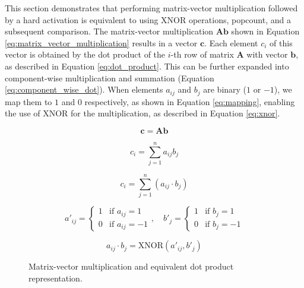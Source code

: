 \documentclass[conference]{IEEEtran}
\begin{document}
This section demonstrates that performing matrix-vector multiplication followed by a hard activation is equivalent to using XNOR operations, popcount, and a subsequent comparison.
The matrix-vector multiplication \(\mathbf{A} \mathbf{b}\) shown in Equation \ref{eq:matrix_vector_multiplication} results in a vector \(\mathbf{c}\). Each element \(c_i\) of this vector is obtained by the dot product of the \(i\)-th row of matrix \(\mathbf{A}\) with vector \(\mathbf{b}\), as described in Equation \ref{eq:dot_product}. This can be further expanded into component-wise multiplication and summation (Equation \ref{eq:component_wise_dot}). When elements \(a_{ij}\) and \(b_j\) are binary (\(1\) or \(-1\)), we map them to \(1\) and \(0\) respectively, as shown in Equation \ref{eq:mapping}, enabling the use of XNOR for the multiplication, as described in Equation \ref{eq:xnor}.

\begin{figure}[ht]
    \centering
    \begin{equation}
    \mathbf{c} = \mathbf{A} \mathbf{b}
    \label{eq:matrix_vector_multiplication}
    \end{equation}

    \begin{equation}
    c_i = \sum_{j=1}^n a_{ij} b_j
    \label{eq:dot_product}
    \end{equation}

    \begin{equation}
    c_i = \sum_{j=1}^n (a_{ij} \cdot b_j)
    \label{eq:component_wise_dot}
    \end{equation}

    \begin{equation}
    a'_{ij} = \begin{cases}
    1 & \text{if } a_{ij} = 1 \\
    0 & \text{if } a_{ij} = -1
    \end{cases}, \quad
    b'_j = \begin{cases}
    1 & \text{if } b_j = 1 \\
    0 & \text{if } b_j = -1
    \end{cases}
    \label{eq:mapping}
    \end{equation}

    \begin{equation}
    a_{ij} \cdot b_j = \text{XNOR}(a'_{ij}, b'_j)
    \label{eq:xnor}
    \end{equation}

    \caption{Matrix-vector multiplication and equivalent dot product representation.}
    \label{fig:matrix_vector_multiplication}
\end{figure}
\end{document}
